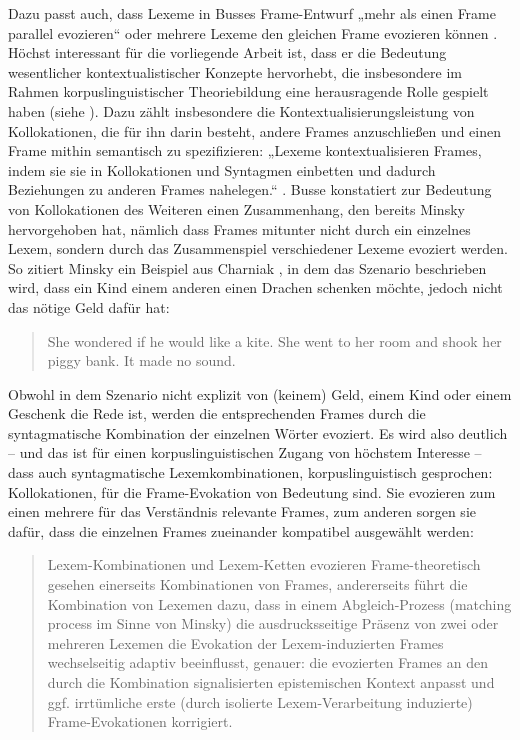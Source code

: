 Dazu passt auch, dass Lexeme in Busses Frame-Entwurf „mehr als einen Frame parallel evozieren`` oder mehrere Lexeme den gleichen Frame evozieren können \autocite[657]{busseFrameSemantikKompendium2012}. Höchst interessant für die vorliegende Arbeit ist, dass er die Bedeutung wesentlicher kontextualistischer Konzepte hervorhebt, die insbesondere im Rahmen korpuslinguistischer Theoriebildung eine herausragende Rolle gespielt haben (siehe ). Dazu zählt insbesondere die Kontextualisierungsleistung von Kollokationen, die für ihn darin besteht, andere Frames anzuschließen und einen Frame mithin semantisch zu spezifizieren: „Lexeme kontextualisieren Frames, indem sie sie in Kollokationen und Syntagmen einbetten und dadurch Beziehungen zu anderen Frames nahelegen.`` \autocite[656]{busseFrameSemantikKompendium2012}. Busse konstatiert zur Bedeutung von Kollokationen des Weiteren einen Zusammenhang, den bereits Minsky hervorgehoben hat, nämlich dass Frames mitunter nicht durch ein einzelnes Lexem, sondern durch das Zusammenspiel verschiedener Lexeme evoziert werden. So zitiert Minsky ein Beispiel aus Charniak \autocite*{charniakModelChildrensStory1972}, in dem das Szenario beschrieben wird, dass ein Kind einem anderen einen Drachen schenken möchte, jedoch nicht das nötige Geld dafür hat:

\begin{quote}
She wondered if he would like a kite. She went to her room and shook her piggy bank. It made no sound. \autocite[Charniak 1972 in][35]{minskyFrameworkRepresentingKnowledge1974}
\end{quote}

Obwohl in dem Szenario nicht explizit von (keinem) Geld, einem Kind oder einem Geschenk die Rede ist, werden die entsprechenden Frames durch die syntagmatische Kombination der einzelnen Wörter evoziert. Es wird also deutlich -- und das ist für einen korpuslinguistischen Zugang von höchstem Interesse -- dass auch syntagmatische Lexemkombinationen, korpuslinguistisch gesprochen: Kollokationen, für die Frame-Evokation von Bedeutung sind. Sie evozieren zum einen mehrere für das Verständnis relevante Frames, zum anderen sorgen sie dafür, dass die einzelnen Frames zueinander kompatibel ausgewählt werden:

\begin{quote}
Lexem-Kombinationen und Lexem-Ketten evozieren Frame-theoretisch gesehen einerseits Kombinationen von Frames, andererseits führt die Kombination von Lexemen dazu, dass in einem Abgleich-Prozess (matching process im Sinne von Minsky) die ausdrucksseitige Präsenz von zwei oder mehreren Lexemen die Evokation der Lexem-induzierten Frames wechselseitig adaptiv beeinflusst, genauer: die evozierten Frames an den durch die Kombination signalisierten epistemischen Kontext anpasst und ggf. irrtümliche erste (durch isolierte Lexem-Verarbeitung induzierte) Frame-Evokationen korrigiert. \autocite[660]{busseFrameSemantikKompendium2012}
\end{quote}

